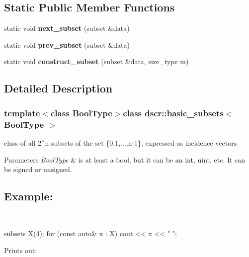 \subsection*{Static Public Member Functions}
\begin{DoxyCompactItemize}
\item 
\hypertarget{classdscr_1_1basic__subsets_af58700a65e7222bc50b8956e0ca373b1}{static void {\bfseries next\-\_\-subset} (subset \&data)}\label{classdscr_1_1basic__subsets_af58700a65e7222bc50b8956e0ca373b1}

\item 
\hypertarget{classdscr_1_1basic__subsets_ae1bf6e2e6a74616eb33ca5a8720464ba}{static void {\bfseries prev\-\_\-subset} (subset \&data)}\label{classdscr_1_1basic__subsets_ae1bf6e2e6a74616eb33ca5a8720464ba}

\item 
\hypertarget{classdscr_1_1basic__subsets_a27188e5ec24c6628482d374e1f19c137}{static void {\bfseries construct\-\_\-subset} (subset \&data, size\-\_\-type m)}\label{classdscr_1_1basic__subsets_a27188e5ec24c6628482d374e1f19c137}

\end{DoxyCompactItemize}


\subsection{Detailed Description}
\subsubsection*{template$<$class Bool\-Type$>$class dscr\-::basic\-\_\-subsets$<$ Bool\-Type $>$}

class of all 2$^\wedge$n subsets of the set \{0,1,...,n-\/1\}, expressed as incidence vectors 


\begin{DoxyParams}{Parameters}
{\em Bool\-Type} & is at least a bool, but it can be an int, uint, etc. It can be signed or unsigned. \subsection*{Example\-:}\\
\hline
\end{DoxyParams}
\begin{DoxyVerb}subsets X(4);
for (const auto& x : X)
    cout << x << " ";
\end{DoxyVerb}


Prints out\-: \begin{DoxyVerb}[0000] [1000] [0100] [1100] [0010] [1010] [0110] [1110] [0001] [1001] [0101] [1101] [0011] [1011] [0111] [1111]\end{DoxyVerb}
 

